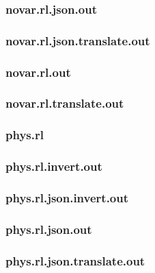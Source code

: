 \subsubsection{novar.rl.json.out}
\label{app:novar_rl.json.out}

\subsubsection{novar.rl.json.translate.out}
\label{app:novar_rl.json.translate.out}

\subsubsection{novar.rl.out}
\label{app:novar_rl.out}

\subsubsection{novar.rl.translate.out}
\label{app:novar_rl.translate.out}

\subsubsection{phys.rl}
\label{app:phys_rl}

\subsubsection{phys.rl.invert.out}
\label{app:phys_rl.invert.out}

\subsubsection{phys.rl.json.invert.out}
\label{app:phys_rl.json.invert.out}

\subsubsection{phys.rl.json.out}
\label{app:phys_rl.json.out}

\subsubsection{phys.rl.json.translate.out}
\label{app:phys_rl.json.translate.out}

